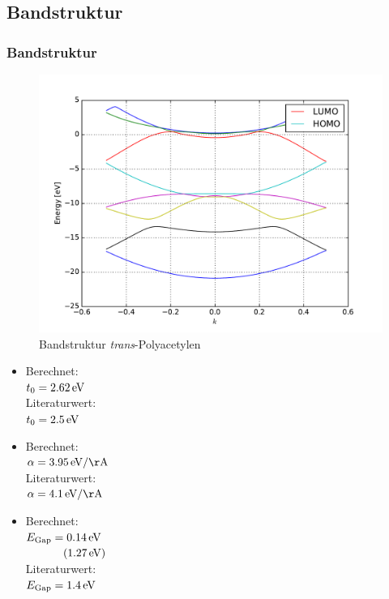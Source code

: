 \subsection{Bandstruktur}
\begin{frame}
\frametitle{Bandstruktur}
\begin{minipage}{0.7\textwidth}
\begin{figure}
	\centering
	\includegraphics[width = \textwidth]{Images/polyacetylene/bands/band_structure}
	\caption{Bandstruktur \emph{trans}-Polyacetylen}
	\label{image_band_structure_relaxed_polyacetylene}
\end{figure}
\end{minipage}
\begin{minipage}{.29\textwidth}
\begin{itemize}
\setlength\itemsep{.2cm}
\item Berechnet:\\
$t_0 = \unit[2.62]{eV}$\\
Literaturwert:\\
$t_0 = \unit[2.5]{eV}$
\item Berechnet:\\
$\alpha = \unit[3.95]{eV/\AA}$\\
Literaturwert:\\
$\alpha = \unit[4.1]{eV/\AA}$
\item Berechnet:\\
$E_\text{Gap} = \unit[0.14]{eV}$\\
$\hspace*{1.15cm}(\unit[1.27]{eV})$\\
Literaturwert:\\
$E_\text{Gap} = \unit[1.4]{eV}$
\end{itemize}
\end{minipage}
\end{frame}


